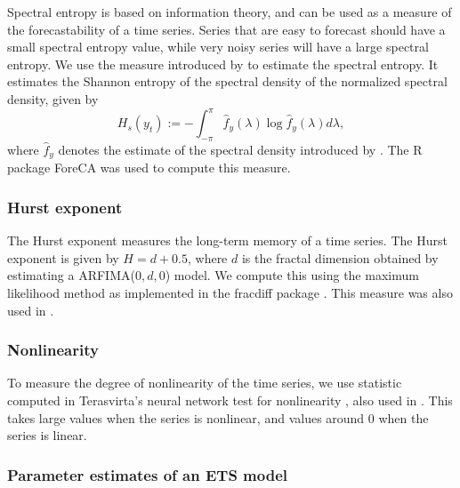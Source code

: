 \documentclass[11pt,a4paper,]{article}
\begin{document}
Spectral entropy is based on information theory, and can be used as a measure of the forecastability of a time series. Series that are easy to forecast should have a small spectral entropy value, while very noisy series will have a large spectral entropy. We use the measure introduced by \textcite{goerg2013forecastable} to estimate the spectral entropy. It estimates the Shannon entropy of the spectral density of the normalized spectral density, given by
\[
  H_{s}(y_t):=-\int_{-\pi}^{\pi}\hat f_y(\lambda)\log \hat f_y({\lambda})d\lambda,
\]
where \(\hat{f}_y\) denotes the estimate of the spectral density introduced by \textcite{nuttall1982spectral}. The R package ForeCA \autocite{Foreca} was used to compute this measure.

\hypertarget{hurst-exponent}{%
\subsubsection*{Hurst exponent}\label{hurst-exponent}}

The Hurst exponent measures the long-term memory of a time series. The Hurst exponent is given by \(H=d+0.5\), where \(d\) is the fractal dimension obtained by estimating a ARFIMA(\(0, d, 0\)) model. We compute this using the maximum likelihood method \autocite{haslett1989space} as implemented in the fracdiff package \autocite{fracdiff}. This measure was also used in \textcite{wang2009rule}.

\hypertarget{nonlinearity}{%
\subsubsection*{Nonlinearity}\label{nonlinearity}}

To measure the degree of nonlinearity of the time series, we use statistic computed in Terasvirta's neural network test for nonlinearity \autocite{nonlintest}, also used in \textcite{wang2009rule}. This takes large values when the series is nonlinear, and values around 0 when the series is linear.

\hypertarget{parameter-estimates-of-an-ets-model}{%
\subsubsection*{Parameter estimates of an ETS model}\label{parameter-estimates-of-an-ets-model}}
\end{document}
